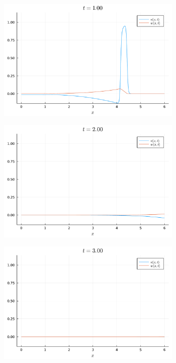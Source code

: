 \documentclass{article}
\begin{document}
\begin{figure}[H]
	\centering
	\begin{subfigure}{0.495\linewidth}
		\centering
		\includegraphics[width=\linewidth]{prob4_t=1.pdf}
	\end{subfigure}
	\begin{subfigure}{0.495\linewidth}
		\centering
		\includegraphics[width=\linewidth]{prob4_t=2.pdf}
	\end{subfigure}
	\begin{subfigure}{0.495\linewidth}
		\centering
		\includegraphics[width=\linewidth]{prob4_t=3.pdf}

\end{subfigure}
\end{figure}
\end{document}
